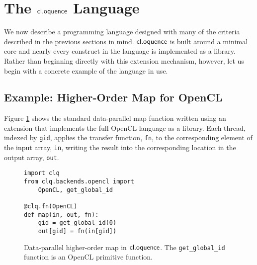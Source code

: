 \documentclass{llncs}
\begin{document}
% 


\section{The $\textsf{cl.oquence}$ Language}
We now describe a programming language designed with many of the criteria described in the previous sections in mind. $\textsf{cl.oquence}$ is built around a minimal core and nearly every construct in the language is implemented as a library. Rather than beginning directly with this extension mechanism, however, let us begin with a concrete example of the language in use.

\subsection{Example: Higher-Order Map for OpenCL}
Figure \ref{map} shows the standard data-parallel map function written using an extension that implements the full OpenCL language as a library. Each thread, indexed by \verb|gid|, applies the transfer function, \verb|fn|, to the  corresponding element of the input array, \verb|in|, writing the result into the corresponding location in the output array, \verb|out|.

\begin{figure}
\small{
\begin{verbatim}
import clq
from clq.backends.opencl import 
    OpenCL, get_global_id

@clq.fn(OpenCL)
def map(in, out, fn):
    gid = get_global_id(0)
    out[gid] = fn(in[gid])
\end{verbatim}}
\caption{Data-parallel higher-order map in $\textsf{cl.oquence}$. The \texttt{get\_global\_id} function is an OpenCL primitive function.}
\label{map}

\end{figure}
\end{document}
